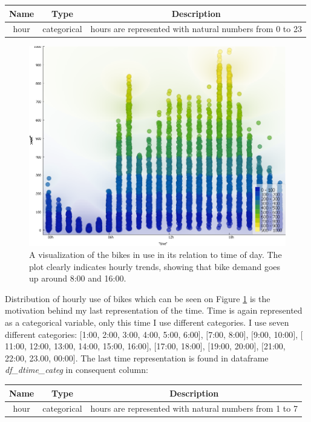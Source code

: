\documentclass[12pt]{article}
\begin{document}
	\begin{center}
		\begin{tabular}{ |c|c|c| } 
			\hline
			\textbf{Name} & \textbf{Type} & \textbf{Description} \\ 
			\hline
			\hline
			hour & categorical & hours are represented with natural numbers from 0 to 23 \\ 
			\hline	
		\end{tabular}
	\end{center}
	
	
	\begin{figure}
		\centering
		\includegraphics[scale=0.4] {graf}
		\caption{\label{fig:1} A visualization of the bikes in use in its relation to time of day. The plot clearly indicates hourly trends, showing that bike demand goes up around 8:00 and 16:00.}
	\end{figure}
	
	Distribution of hourly use of bikes which can be seen on Figure \ref{fig:1} is the motivation behind my last representation of the time. Time is again represented as a categorical variable, only this time I use different categories. I use seven different categories: $[$1:00, 2:00, 3:00, 4:00, 5:00, 6:00$]$, $[$7:00, 8:00$]$, $[$9:00, 10:00$]$, $[$11:00, 12:00, 13:00, 14:00, 15:00, 16:00$]$, $[$17:00, 18:00$]$, $[$19:00, 20:00$]$, $[$21:00, 22:00, 23.00, 00:00$]$. The last time representation is found in dataframe \textit{df\_dtime\_categ} in consequent column:
	
	\begin{center}
		\begin{tabular}{ |c|c|c| } 
			\hline
			\textbf{Name} & \textbf{Type} & \textbf{Description} \\ 
			\hline
			\hline
			hour & categorical & hours are represented with natural numbers from 1 to 7 \\ 
			\hline	
		\end{tabular}
	\end{center}
			
\end{document}
